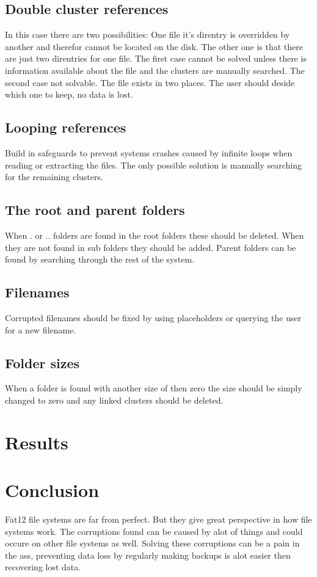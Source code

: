 \documentclass[pdftex,12pt,a4paper]{article}
\begin{document}
\subsection{Double cluster references}
In this case there are two possibilities: One file it's direntry is overridden by another and therefor cannot be located on the disk. The other one is that there are just two direntries for one file. The first case cannot be solved unless there is information available about the file and the clusters are manually searched. The second case not solvable. The file exists in two places. The user should deside which one to keep, no data is lost.
\subsection{Looping references}
Build in safeguards to prevent systems crashes caused by infinite loops when reading or extracting the files. The only possible solution is manually searching for the remaining clusters.
\subsection{The root and parent folders}
When . or .. folders are found in the root folders these should be deleted. When they are not found in sub folders they should be added. Parent folders can be found by searching through the rest of the system.
\subsection{Filenames}
Corrupted filenames should be fixed by using placeholders or querying the user for a new filename.
\subsection{Folder sizes}
When a folder is found with another size of then zero the size should be simply changed to zero and any linked clusters should be deleted.
\section{Results}

\section{Conclusion}
Fat12 file systems are far from perfect. But they give great perspective in how file systems work. The corruptions found can be caused by alot of things and could occure on other file systems as well. Solving these corruptions can be a pain in the ass, preventing data loss by regularly making backups is alot easier then recovering lost data. 
\end{document}
